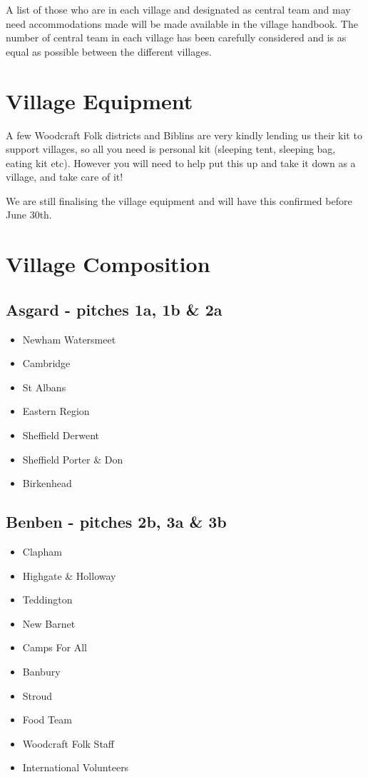 \documentclass[a4paper, 11pt]{report}
\newcommand{\nl}{\newline}
\begin{document}
A list of those who are in each village and designated as central team and may need accommodations made will be made available in the village handbook. The number of central team in each village has been carefully considered and is as equal as possible between the different villages.

\section{Village Equipment}
A few Woodcraft Folk districts and Biblins are very kindly lending us their kit to support villages, so all you need is personal kit (sleeping tent, sleeping bag, eating kit etc). However you will need to help put this up and take it down as a village, and take care of it!\nl

We are still finalising the village equipment and will have this confirmed before June 30th. 

\section{Village Composition}
\subsection{Asgard - pitches 1a, 1b \& 2a}
\begin{itemize}
    \item Newham Watersmeet
    \item Cambridge
    \item St Albans
    \item Eastern Region
    \item Sheffield Derwent
    \item Sheffield Porter \& Don
    \item Birkenhead
\end{itemize}
\subsection{Benben - pitches 2b, 3a \& 3b}
\begin{itemize}
    \item Clapham
    \item Highgate \& Holloway
    \item Teddington
    \item New Barnet
    \item Camps For All
    \item Banbury
    \item Stroud
    \item Food Team
    \item Woodcraft Folk Staff
    \item International Volunteers
\end{itemize}
\end{document}

